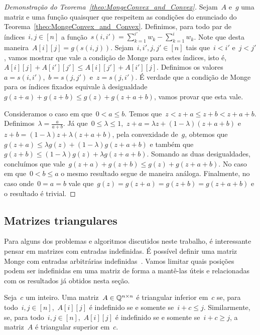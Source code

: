 \begin{proof}[Demonstração do Teorema~\ref{theo:MongeConvex_and_Convex}]
Sejam~$A$ e~$g$ uma matriz e uma função quaisquer que respeitem as condições do enunciado do Teorema~\ref{theo:MongeConvex_and_Convex}. Definimos, para todo par de índices~${ i,j \in [n] }$ a função~${ s(i,i') = \sum\limits_{k=1}^{i'} w_k - \sum\limits_{k=1}^i w_k }$. Note que desta maneira~${ A[i][j] = g(s(i,j)) }$. Sejam~${ i,i',j,j' \in [n] }$ tais que~${ i < i' }$ e~${ j < j' }$, vamos mostrar que vale a condição de Monge para estes índices, isto é,~${ A[i][j] + A[i'][j'] \leq A[i][j'] + A[i'][j] }$. Definimos os valores~${ a = s(i,i') }$,~${ b = s(j,j') }$ e~${ z = s(j,i') }$. É verdade que a condição de Monge para os índices fixados equivale à desigualdade~${ g(z+a) + g(z+b) \leq g(z) + g(z+a+b) }$, vamos provar que esta vale.

Consideramos o caso em que~${ 0 < a \leq b }$. Temos que~${ z < z+a \leq z + b < z + a + b }$. Definimos~${ \lambda = \frac{a}{a+b} }$. Já que~${ 0 \leq \lambda \leq 1 }$,~${ z + a = \lambda z + (1 - \lambda)(z+a+b) }$ e~${ z + b = (1 - \lambda)z + \lambda(z+a+b) }$, pela convexidade de~$g$, obtemos que~${ g(z+a) \leq \lambda g(z) + (1 - \lambda)g(z+a+b) }$ e também que~${ g(z+b) \leq (1-\lambda) g(z) + \lambda g(z+a+b) }$. Somando as duas desigualdades, concluímos que vale~${ g(z+a) + g(z+b) \leq g(z) + g(z+a+b) }$. No caso em que~${ 0 < b \leq a }$ o mesmo resultado segue de maneira análoga. Finalmente, no caso onde~${ 0 = a = b }$ vale que~${ g(z) = g(z+a) = g(z+b) = g(z+a+b) }$ e o resultado é trivial.
\end{proof}


\subsection{Matrizes triangulares} \label{Monge:Triangular} 

Para alguns dos problemas e algoritmos discutidos neste trabalho, é interessante pensar em matrizes com entradas indefinidas. É possível definir uma matriz Monge com entradas arbitrárias indefinidas~\cite[Seção 9.4]{Burkard:1996}. Vamos limitar quais posições podem ser indefinidas em uma matriz de forma a mantê-las úteis e relacionadas com os resultados já obtidos nesta seção. 

\begin{defi}
Seja~$c$ um inteiro. Uma matriz~$A \in \mathbb{Q}^{n \times n}$ é triangular inferior em~$c$ se, para todo~${ i,j \in [n] }$,~$A[i][j]$ é indefinido se e somente se~${ i + c \leq j }$. Similarmente, se, para todo~${i,j \in [n]}$,~$A[i][j]$ é indefinido se e somente se~${ i + c \geq j }$, a matriz~$A$ é triangular superior em~$c$.
\end{defi}

